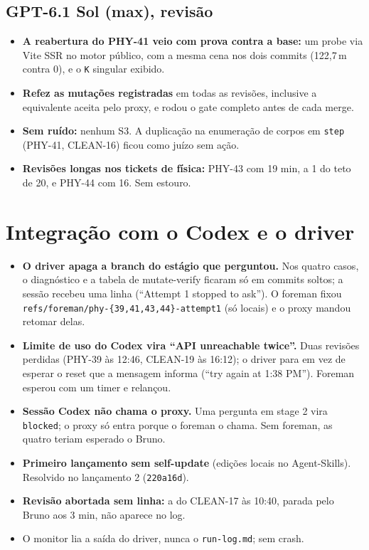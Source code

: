 \documentclass[11pt,a4paper]{article}
\begin{document}
\subsection*{GPT-6.1 Sol (max), revisão}
\begin{itemize}
  \item \textbf{A reabertura do PHY-41 veio com prova contra a base:} um
        probe via Vite SSR no motor público, com a mesma cena nos dois commits
        (122,7\,m contra 0), e o \texttt{K} singular exibido.
  \item \textbf{Refez as mutações registradas} em todas as revisões,
        inclusive a equivalente aceita pelo proxy, e rodou o gate completo antes
        de cada merge.
  \item \textbf{Sem ruído:} nenhum S3. A duplicação na enumeração de corpos em
        \texttt{step} (PHY-41, CLEAN-16) ficou como juízo sem ação.
  \item \textbf{Revisões longas nos tickets de física:} PHY-43 com 19 min, a 1
        do teto de 20, e PHY-44 com 16. Sem estouro.
\end{itemize}

\section{Integração com o Codex e o driver}
\begin{itemize}
  \item \textbf{O driver apaga a branch do estágio que perguntou.} Nos
        quatro casos, o diagnóstico e a tabela de mutate-verify ficaram só em
        commits soltos; a sessão recebeu uma linha (``Attempt 1 stopped to
        ask''). O foreman fixou \texttt{refs/foreman/phy-\{39,41,43,44\}-attempt1}
        (só locais) e o proxy mandou retomar delas.
  \item \textbf{Limite de uso do Codex vira ``API unreachable twice''.} Duas
        revisões perdidas (PHY-39 às 12:46, CLEAN-19 às 16:12); o driver
        para em vez de esperar o reset que a mensagem informa (``try again at
        1:38 PM''). Foreman esperou com um timer e relançou.
  \item \textbf{Sessão Codex não chama o proxy.} Uma pergunta em stage 2 vira
        \texttt{blocked}; o proxy só entra porque o foreman o chama. Sem
        foreman, as quatro teriam esperado o Bruno.
  \item \textbf{Primeiro lançamento sem self-update} (edições locais no
        Agent-Skills). Resolvido no lançamento 2 (\texttt{220a16d}).
  \item \textbf{Revisão abortada sem linha:} a do CLEAN-17 às 10:40, parada
        pelo Bruno aos 3 min, não aparece no log.
  \item O monitor lia a saída do driver, nunca o \texttt{run-log.md}; sem
        crash.
\end{itemize}
\end{document}
